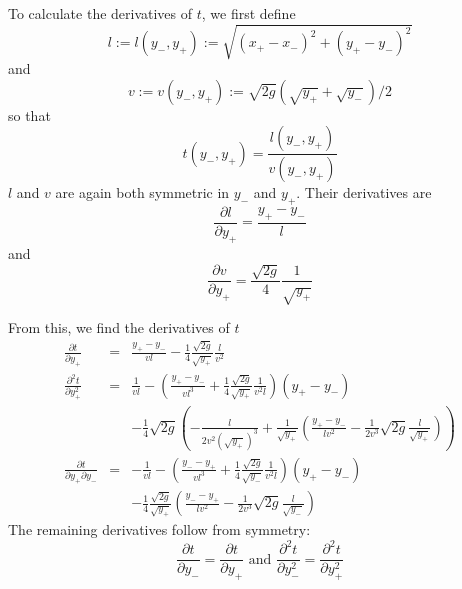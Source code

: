 \documentclass[a4paper]{article}
\begin{document}
To calculate the derivatives of $t$, we first define
\begin{equation}
l := l(y_-, y_+) := \sqrt{(x_+ - x_-)^2 + (y_+ - y_-)^2}
\end{equation}
and
\begin{equation}
v := v(y_-, y_+) := \sqrt{2g} (\sqrt{y_+} + \sqrt{y_-})/2
\end{equation}
so that
\begin{equation}
t(y_-, y_+) = \frac{l(y_-, y_+)}{v(y_-, y_+)}
\end{equation}
$l$ and $v$ are again both symmetric in $y_-$ and $y_+$. Their derivatives are
\begin{equation}
\frac{\partial l}{\partial y_+} = \frac{y_+ - y_-}{l}
\end{equation}
and
\begin{equation}
\frac{\partial v}{\partial y_+} = \frac{\sqrt{2g}}{4} \frac{1}{\sqrt{y_+}}
\end{equation}

From this, we find the derivatives of $t$
\begin{eqnarray}
\frac{\partial t}{\partial y_+}
&=& \frac{y_+ - y_-}{vl} - \frac{1}{4} \frac{\sqrt{2g}}{\sqrt{y_+}} \frac{l}{v^2}\\
\frac{\partial^2 t}{\partial y_+^2} &=&
\frac{1}{vl} - \left(\frac{y_+ - y_-}{v l^3} + 
    \frac{1}{4}\frac{\sqrt{2g}}{\sqrt{y_+}}\frac{1}{v^2l}\right)(y_+ - y_-)\\
\nonumber&&- \frac{1}{4} \sqrt{2g} \left(- \frac{l}{2v^2(\sqrt{y_+})^3} +
    \frac{1}{\sqrt{y_+}}\left(\frac{y_+ - y_-}{l v^2} - \frac{1}{2 v^3}
    \sqrt{2g}\frac{l}{\sqrt{y_+}}\right)\right)\\
\frac{\partial t}{\partial y_+ \partial y_-} &=&
-\frac{1}{vl} - \left(\frac{y_- - y_+}{v l^3} +
    \frac{1}{4} \frac{\sqrt{2g}}{\sqrt{y_-}}\frac{1}{v^2 l}\right)
    (y_+ - y_-)\\
\nonumber&& - \frac{1}{4}\frac{\sqrt{2g}}{\sqrt{y_+}}
    \left(\frac{y_- - y_+}{l v^2} - \frac{1}{2 v^3} \sqrt{2g}
    \frac{l}{\sqrt{y_-}}\right)
\end{eqnarray}
The remaining derivatives follow from symmetry:
\begin{equation}
\frac{\partial t}{\partial y_-} = \frac{\partial t}{\partial y_+}
\mbox{ and }
\frac{\partial^2 t}{\partial y_-^2} = \frac{\partial^2 t}{\partial y_+^2}
\end{equation}
\end{document}

